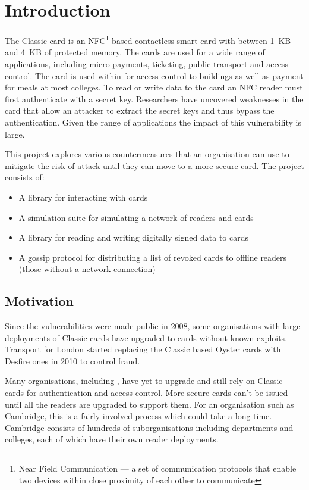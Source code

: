 \documentclass[final,dissertation.tex]{subfiles}
\begin{document}
  \chapter{Introduction}

  The \mifare{} Classic card is an NFC\footnote{Near Field Communication --- a set of communication protocols that enable two devices within close proximity of each other to communicate} based contactless smart-card with between \SI{1}{KB} and \SI{4}{KB} of protected memory. The cards are used for a wide range of applications, including micro-payments, ticketing, public transport and access control. The card is used within \UoC{} for access control to buildings as well as payment for meals at most colleges. To read or write data to the card an NFC reader must first authenticate with a secret key. Researchers have uncovered weaknesses in the card that allow an attacker to extract the secret keys and thus bypass the authentication. Given the range of applications the impact of this vulnerability is large.

  This project explores various countermeasures that an organisation can use to mitigate the risk of attack until they can move to a more secure card. The project consists of:
  \begin{itemize}
    \item A library for interacting with \mifare{} cards
    \item A simulation suite for simulating a network of readers and cards
    \item A library for reading and writing digitally signed data to \mifare{} cards
    \item A gossip protocol for distributing a list of revoked cards to offline readers (those without a network connection)
  \end{itemize}

  \section{Motivation}

  Since the vulnerabilities were made public in 2008, some organisations with large deployments of \mifare{} Classic cards have upgraded to cards without known exploits. Transport for London started replacing the \mifare{} Classic based Oyster cards with \mifare{} Desfire ones in 2010 to control fraud.

  Many organisations, including \UoC{}, have yet to upgrade and still rely on \mifare{} Classic cards for authentication and access control. More secure cards can't be issued until all the readers are upgraded to support them. For an organisation such as Cambridge, this is a fairly involved process which could take a long time. Cambridge consists of hundreds of suborganisations including departments and colleges, each of which have their own reader deployments.
\end{document}
